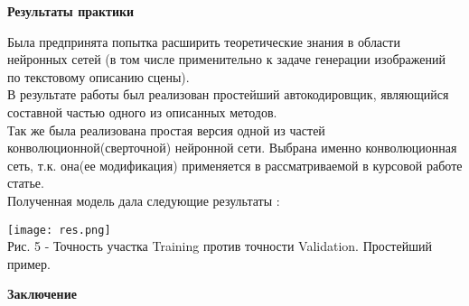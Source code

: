 \documentclass{article}
\begin{document}
\newpage
    \begin{center} 
    \huge \textbf{Результаты практики} \\[0.5cm]
    \end{center} 
      \large Была предпринята попытка расширить теоретические знания в области нейронных сетей (в том числе применительно к задаче генерации изображений по текстовому описанию сцены).\\
      В результате работы был реализован простейший автокодировщик, являющийся составной частью одного из описанных методов.\\
      Так же была реализована простая версия одной из частей конволюционной(сверточной) нейронной сети. Выбрана именно конволюционная сеть, т.к. она(ее модификация) применяется в рассматриваемой в курсовой работе статье. \\
      Полученная модель дала следующие результаты :
      \begin{center} 
      \texttt{[image: res.png]}
      \\
      \caption*{Рис. 5 - Точность участка Training  против точности Validation. Простейший пример.}
      \end{center} 
\newpage
    \begin{center} 
    \huge \textbf{Заключение} \\[0.5cm]
    \end{center} 
      \large 
\end{document}
